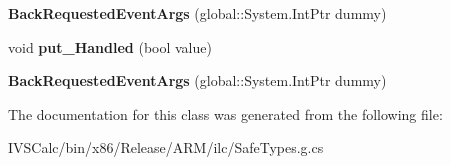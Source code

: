 \begin{DoxyCompactItemize}
\mbox{\label{class_windows_1_1_u_i_1_1_core_1_1_back_requested_event_args_a7db6ca09f29ccbee05000b227ff44577}} 
{\bfseries Back\+Requested\+Event\+Args} (global\+::\+System.\+Int\+Ptr dummy)
\item 
\mbox{\label{class_windows_1_1_u_i_1_1_core_1_1_back_requested_event_args_ac33fd05b1cfdb71ff37e8ece87d7c2ce}} 
void {\bfseries put\+\_\+\+Handled} (bool value)
\item 
\mbox{\label{class_windows_1_1_u_i_1_1_core_1_1_back_requested_event_args_a7db6ca09f29ccbee05000b227ff44577}} 
{\bfseries Back\+Requested\+Event\+Args} (global\+::\+System.\+Int\+Ptr dummy)
\end{DoxyCompactItemize}


The documentation for this class was generated from the following file\+:\begin{DoxyCompactItemize}
\item 
I\+V\+S\+Calc/bin/x86/\+Release/\+A\+R\+M/ilc/Safe\+Types.\+g.\+cs\end{DoxyCompactItemize}
